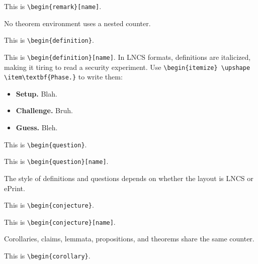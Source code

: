 \begin{remark}
[name]
This is \texttt{\textbackslash begin\{remark\}[name]}.
\end{remark}

\noindent
No theorem environment uses a nested counter.

\begin{definition}
This is \texttt{\textbackslash begin\{definition\}}.
\end{definition}

\begin{definition}
[name]
This is \texttt{\textbackslash begin\{definition\}[name]}.
In LNCS formats, definitions are italicized,
making it tiring to read a security experiment.
Use
\texttt{\textbackslash begin\{itemize\}%
\textbackslash upshape%
\textbackslash item\textbackslash textbf\{Phase.\}}
to write them:
\begin{itemize}\upshape
\item\textbf{Setup.} Blah.
\item\textbf{Challenge.} Bruh.
\item\textbf{Guess.} Bleh.
\end{itemize}
\end{definition}

\begin{question}
This is \texttt{\textbackslash begin\{question\}}.
\end{question}

\begin{question}
[name]
This is \texttt{\textbackslash begin\{question\}[name]}.
\end{question}

\noindent
The style of definitions and questions depends on
whether the layout is LNCS or ePrint.

\begin{conjecture}
This is \texttt{\textbackslash begin\{conjecture\}}.
\end{conjecture}

\begin{conjecture}
[name]
This is \texttt{\textbackslash begin\{conjecture\}[name]}.
\end{conjecture}

\noindent
Corollaries, claims, lemmata, propositions, and theorems
share the same counter.

\begin{corollary}
This is \texttt{\textbackslash begin\{corollary\}}.
\end{corollary}

